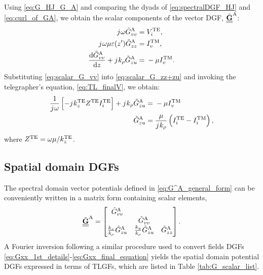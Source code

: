 %
Using \eqref{eq:G_HJ_G_A} and comparing the dyads of \eqref{eq:spectralDGF_HJ} and \eqref{eq:curl_of_GA}, we obtain the scalar components of the vector DGF, $\underline{\underline{\tilde{\mathbf{G}}}}^\mathrm{A}$:
%
\begin{subequations}
  \begin{align}
    {j}\mkern1mu \omega  \tilde{G}^\mathrm{A}_{vv} ={}& V_i^{\mathrm{TE}},
    \label{eq:scalar_G_vv}\\
    {j}\mkern1mu \omega \mu \varepsilon(z') \tilde{G}^\mathrm{A}_{zz} ={}& I_v^{\mathrm{TM}},
    \label{eq:scalar_G_zz}\\
    \dv{\tilde{G}^\mathrm{A}_{vv}}{z} + {j}\mkern1mu k_{\rho} \tilde{G}^\mathrm{A}_{zu} ={}& - \mu I_v^{\mathrm{TM}}.
    \label{eq:scalar_G_zz+zu}
  \end{align}
  \label{eq:components_GA}%
\end{subequations}
%
Substituting \eqref{eq:scalar_G_vv} into \eqref{eq:scalar_G_zz+zu} and invoking the telegrapher's equation, \eqref{eq:TL_finalV}, we obtain:
%
\begin{equation}
  \begin{split}
    \frac{1}{{j}\mkern1mu \omega} \left[ -{j}\mkern1mu k_z^{\mathrm{TE}} Z^{\mathrm{TE}} I_i^{\mathrm{TE}} \right] + {j}\mkern1mu k_{\rho} \tilde{G}^\mathrm{A}_{zu} ={}& - \mu I_v^{\mathrm{TM}} \\
    \tilde{G}^\mathrm{A}_{zu} ={}& \frac{\mu}{{j}\mkern1mu k_{\rho}} \left( I_i^{\mathrm{TE}} - I_i^{\mathrm{TM}} \right),
  \end{split}
  \label{eq:scalar_G_zu}
\end{equation}
%
where $Z^{\mathrm{TE}} = \omega \mu/ k_z^{\mathrm{TE}}$.
\subsection{Spatial domain DGFs}
%
The spectral domain vector potentials defined in \eqref{eq:G^A_general_form} can be conveniently written in a matrix form containing scalar elements,
%
\begin{equation}
  \underline{\underline{\tilde{\mathbf{G}}}}^\mathrm{A}
  =
  \begin{bmatrix}
    \tilde{G}^\mathrm{A}_{vv} &  &  \\
     & \tilde{G}^\mathrm{A}_{vv} & \\
     \frac{k_x}{k_{\rho}} \tilde{G}^\mathrm{A}_{zu} & \frac{k_y}{k_{\rho}} \tilde{G}^\mathrm{A}_{zu} & \tilde{G}^\mathrm{A}_{zz}
  \end{bmatrix}
  \label{eq:G_A_matrix_form}.
\end{equation}
%
A Fourier inversion following a similar procedure used to convert fields DGFs \eqref{eq:Gxx_1st_details}-\eqref{eq:Gxx_final_equation} yields the spatial domain potential DGFs expressed in terms of TLGFs, which are listed in Table \ref{tab:G_scalar_list}.
%


